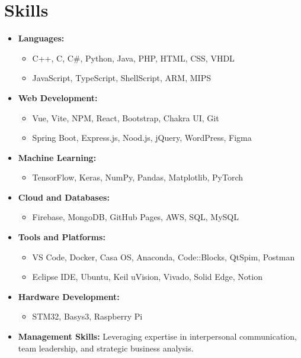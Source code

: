\documentclass[letterpaper,11pt]{article}
\newcommand{\resumeItem}[1]{
    \item\small{
    {#1 \vspace{-2pt}}
    }
}
\newcommand{\resumeSubHeadingListStart}{\begin{itemize}[leftmargin=0.15in, label={}]}
\newcommand{\resumeSubHeadingListEnd}{\end{itemize}}
\begin{document}
    \section{Skills}
    \resumeSubHeadingListStart
        \item\textbf{Languages:}
        \begin{itemize}[leftmargin=0.3in, label={$\rightarrow$}]
            \resumeItem{C++, C, C\#, Python, Java, PHP, HTML, CSS, VHDL}
            \resumeItem{JavaScript, TypeScript, ShellScript, ARM, MIPS}
        \end{itemize}
        \item\textbf{Web Development:}
        \begin{itemize}[leftmargin=0.3in, label={$\rightarrow$}]
            \resumeItem{Vue, Vite, NPM, React, Bootstrap, Chakra UI, Git}
            \resumeItem{Spring Boot, Express.js, Nood.js, jQuery, WordPress, Figma}
        \end{itemize}
        \resumeItem{\textbf{Machine Learning:}}
        \begin{itemize}[leftmargin=0.3in, label={$\rightarrow$}]
            \resumeItem{TensorFlow, Keras, NumPy, Pandas, Matplotlib, PyTorch}
        \end{itemize}
        \item\textbf{Cloud and Databases:}
        \begin{itemize}[leftmargin=0.3in, label={$\rightarrow$}]
            \resumeItem{Firebase, MongoDB, GitHub Pages, AWS, SQL, MySQL}
        \end{itemize}
        \item\textbf{Tools and Platforms:}
        \begin{itemize}[leftmargin=0.3in, label={$\rightarrow$}]
            \resumeItem{VS Code, Docker, Casa OS, Anaconda, Code::Blocks, QtSpim, Postman}
            \resumeItem{Eclipse IDE, Ubuntu, Keil uVision, Vivado, Solid Edge, Notion}
        \end{itemize}
        \item\textbf{Hardware Development:}
        \begin{itemize}[leftmargin=0.3in, label={$\rightarrow$}]
            \resumeItem{STM32, Basys3, Raspberry Pi}
        \end{itemize}
        \resumeItem{\textbf{Management Skills:} Leveraging expertise in interpersonal communication, team leadership, and strategic business analysis.}
    \resumeSubHeadingListEnd

\end{document}
